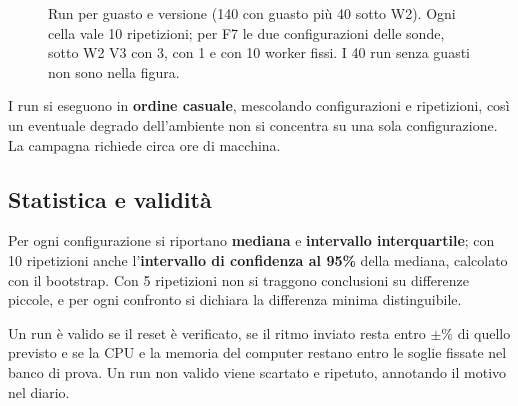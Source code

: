 \begin{figure}[H]
\centering
{}
\caption{Run per guasto e versione (140 con guasto più 40 sotto W2). Ogni cella vale 10 ripetizioni; per F7 le due configurazioni delle sonde, sotto W2 V3 con 3, con 1 e con 10 worker fissi. I 40 run senza guasti non sono nella figura.}
\label{fig:matrice}
\end{figure}

I run si eseguono in \textbf{ordine casuale}, mescolando configurazioni e ripetizioni, così un eventuale degrado dell'ambiente non si concentra su una sola configurazione. La campagna richiede circa  ore di macchina.

\subsection{Statistica e validità}

Per ogni configurazione si riportano \textbf{mediana} e \textbf{intervallo interquartile}; con 10 ripetizioni anche l'\textbf{intervallo di confidenza al 95\%} della mediana, calcolato con il bootstrap. Con 5 ripetizioni non si traggono conclusioni su differenze piccole, e per ogni confronto si dichiara la differenza minima distinguibile.

Un run è valido se il reset è verificato, se il ritmo inviato resta entro $\pm$\% di quello previsto e se la CPU e la memoria del computer restano entro le soglie fissate nel banco di prova. Un run non valido viene scartato e ripetuto, annotando il motivo nel diario.
